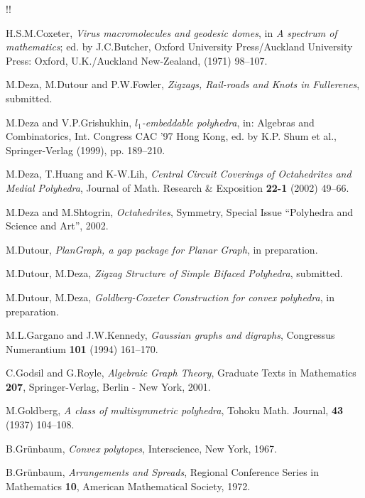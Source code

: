 \documentclass[12pt]{article}
\begin{document}
\newpage!!
\begin{thebibliography}{99}



H.S.M.Coxeter, {\em Virus macromolecules and geodesic domes}, in {\em A spectrum of mathematics}; ed. by J.C.Butcher, Oxford University Press/Auckland University Press: Oxford, U.K./Auckland New-Zealand, (1971) 98--107.


M.Deza, M.Dutour and P.W.Fowler,
{\em Zigzags, Rail-roads and Knots in Fullerenes},
submitted.


M.Deza and V.P.Grishukhin,
{\em $l_1$-embeddable polyhedra},
in: Algebras and Combinatorics, Int. Congress CAC '97 Hong Kong,
ed. by K.P. Shum et al., Springer-Verlag (1999), pp. 189--210.


M.Deza, T.Huang and K-W.Lih,
{\em Central Circuit Coverings of Octahedrites and Medial Polyhedra},
Journal of Math. Research \& Exposition {\bf 22-1} (2002) 49--66.


M.Deza and M.Shtogrin,
{\em Octahedrites}, 
Symmetry, Special Issue ``Polyhedra and Science and Art'', 2002.


M.Dutour, {\em PlanGraph, a gap package for Planar Graph}, in preparation.


M.Dutour, M.Deza, {\em Zigzag Structure of Simple Bifaced Polyhedra}, submitted.


M.Dutour, M.Deza, {\em Goldberg-Coxeter Construction for convex polyhedra}, in preparation.


M.L.Gargano and J.W.Kennedy,
{\em Gaussian graphs and digraphs}, Congressus Numerantium {\bf 101}
(1994) 161--170.


C.Godsil and G.Royle, {\em Algebraic Graph Theory}, Graduate Texts in 
Mathematics {\bf 207}, Springer-Verlag, Berlin - New York, 2001.


M.Goldberg, {\em A class of multisymmetric polyhedra}, Tohoku Math.
Journal, {\bf 43} (1937) 104--108.


B.Gr\"{u}nbaum, {\em Convex polytopes}, Interscience, New York, 1967.


B.Gr\"{u}nbaum, {\em Arrangements and Spreads}, Regional Conference Series in
Mathematics {\bf 10}, American Mathematical Society, 1972.



\end{thebibliography}
\end{document}

